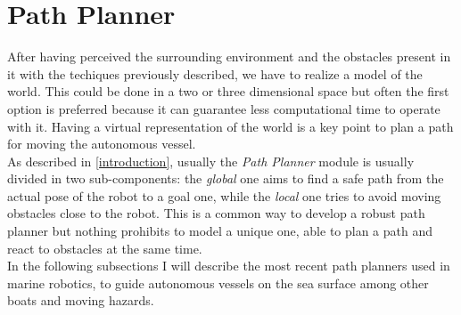 \documentclass[journal]{IEEEtran}
\begin{document}
\section{Path Planner} \label{path_planner}
After having perceived the surrounding environment and the obstacles present in it with the techiques previously described, we have to realize a model of the world. This could be done in a two or three dimensional space but often the first option is preferred because it can guarantee less computational time to operate with it. Having a virtual representation of the world is a key point to plan a path for moving the autonomous vessel.\\
As described in \ref{introduction}, usually the \textit{Path Planner} module is usually divided in two sub-components: the \textit{global} one aims to find a safe path from the actual pose of the robot to a goal one, while the \textit{local} one tries to avoid moving obstacles close to the robot. This is a common way to develop a robust path planner but nothing prohibits  to model a unique one, able to plan a path and react to obstacles at the same time.\\
\indent In the following subsections I will describe the most recent path planners used in marine robotics, to guide autonomous vessels on the sea surface among other boats and moving hazards.
\end{document}
